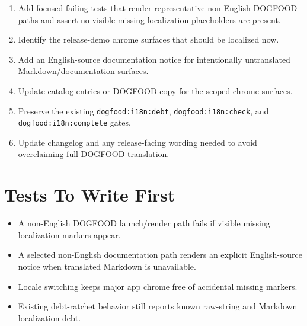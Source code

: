 \begin{enumerate}
\def\labelenumi{\arabic{enumi}.}
\tightlist
\item
  Add focused failing tests that render representative non-English DOGFOOD paths and assert no visible missing-localization placeholders are present.
\item
  Identify the release-demo chrome surfaces that should be localized now.
\item
  Add an English-source documentation notice for intentionally untranslated Markdown/documentation surfaces.
\item
  Update catalog entries or DOGFOOD copy for the scoped chrome surfaces.
\item
  Preserve the existing \texttt{d\allowbreak{}o\allowbreak{}g\allowbreak{}f\allowbreak{}o\allowbreak{}o\allowbreak{}d\allowbreak{}:\allowbreak{}i\allowbreak{}1\allowbreak{}8\allowbreak{}n\allowbreak{}:\allowbreak{}d\allowbreak{}e\allowbreak{}b\allowbreak{}t}, \texttt{d\allowbreak{}o\allowbreak{}g\allowbreak{}f\allowbreak{}o\allowbreak{}o\allowbreak{}d\allowbreak{}:\allowbreak{}i\allowbreak{}1\allowbreak{}8\allowbreak{}n\allowbreak{}:\allowbreak{}c\allowbreak{}h\allowbreak{}e\allowbreak{}c\allowbreak{}k}, and \texttt{d\allowbreak{}o\allowbreak{}g\allowbreak{}f\allowbreak{}o\allowbreak{}o\allowbreak{}d\allowbreak{}:\allowbreak{}i\allowbreak{}1\allowbreak{}8\allowbreak{}n\allowbreak{}:\allowbreak{}c\allowbreak{}o\allowbreak{}m\allowbreak{}p\allowbreak{}l\allowbreak{}e\allowbreak{}t\allowbreak{}e} gates.
\item
  Update changelog and any release-facing wording needed to avoid overclaiming full DOGFOOD translation.
\end{enumerate}

\section{Tests To Write First}\label{record-196-tests-to-write-first}

\begin{itemize}
\tightlist
\item
  A non-English DOGFOOD launch/render path fails if visible missing localization markers appear.
\item
  A selected non-English documentation path renders an explicit English-source notice when translated Markdown is unavailable.
\item
  Locale switching keeps major app chrome free of accidental missing markers.
\item
  Existing debt-ratchet behavior still reports known raw-string and Markdown localization debt.
\end{itemize}

